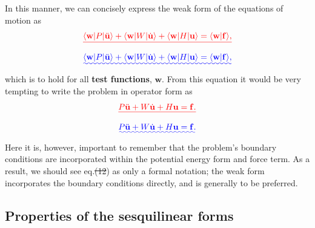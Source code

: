 \documentclass[a4paper,12pt]{paper}
\providecommand{\DIFadd}[1]{{\protect\color{blue}\uwave{#1}}} %
\providecommand{\DIFdel}[1]{{\protect\color{red}\sout{#1}}}                      %
\providecommand{\DIFaddbegin}{} %
\providecommand{\DIFaddend}{} %
\providecommand{\DIFdelbegin}{} %
\providecommand{\DIFdelend}{} %
\begin{document}
In this manner, we can concisely express the weak form of the equations of motion as
\DIFdelbegin \begin{displaymath}
\DIFdel{\langle \mathbf{w}|P|\ddot{\mathbf{u}}\rangle+\langle \mathbf{w}|W|\dot{\mathbf{u}}\rangle+\langle \mathbf{w}|H|\mathbf{u}\rangle=\langle \mathbf{w}|\mathbf{f}\rangle,
}\end{displaymath}%
\DIFdelend \DIFaddbegin \begin{equation}
\DIFadd{\langle \mathbf{w}|P|\ddot{\mathbf{u}}\rangle+\langle \mathbf{w}|W|\dot{\mathbf{u}}\rangle+\langle \mathbf{w}|H|\mathbf{u}\rangle=\langle \mathbf{w}|\mathbf{f}\rangle,
\label{eq:11}
}\end{equation}\DIFaddend 
which is to hold for all \textbf{test functions}, $\mathbf{w}$. From this equation it would be very tempting to write the problem in operator form as
\DIFdelbegin \begin{displaymath}
\DIFdel{P\ddot{\mathbf{u}}+W\dot{\mathbf{u}}+H\mathbf{u}=\mathbf{f}.
}\end{displaymath}%
\DIFdelend \DIFaddbegin \begin{equation}
\DIFadd{P\ddot{\mathbf{u}}+W\dot{\mathbf{u}}+H\mathbf{u}=\mathbf{f}.
\label{eq:12}
}\end{equation}\DIFaddend 
Here it is, however, important to remember that the problem's boundary conditions are incorporated within the potential energy form and force term. As a result, we should see eq.\DIFdelbegin \DIFdel{(12}\DIFdelend \DIFaddbegin \DIFadd{~(\ref{eq:12}}\DIFaddend ) as only a formal notation; the weak form incorporates the boundary conditions directly, and is generally to be preferred.

\subsection*{Properties of the sesquilinear forms}
\end{document}
